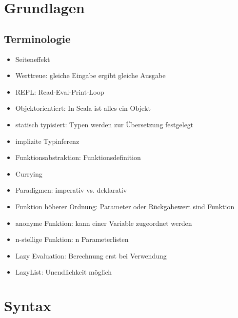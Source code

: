 \section{Grundlagen}
\subsection{Terminologie}
\begin{itemize}
	\item Seiteneffekt
	\item Werttreue: gleiche Eingabe ergibt gleiche Ausgabe
	\item REPL: Read-Eval-Print-Loop
	\item Objektorientiert: In Scala ist alles ein Objekt
	\item statisch typisiert: Typen werden zur Übersetzung festgelegt
	\item implizite Typinferenz
	\item Funktionsabstraktion: Funktionsdefinition
	\item Currying
	\item Paradigmen: imperativ vs. deklarativ
	\item Funktion höherer Ordnung: Parameter oder Rückgabewert sind Funktion
	\item anonyme Funktion: kann einer Variable zugeordnet werden
	\item n-stellige Funktion: n Parameterlisten
	\item Lazy Evaluation: Berechnung erst bei Verwendung
	\item LazyList: Unendlichkeit möglich
\end{itemize}
\section{Syntax}
